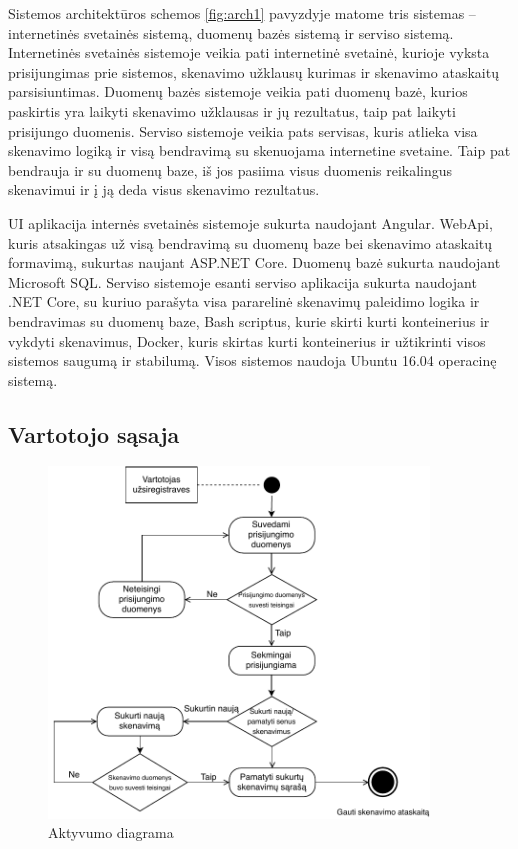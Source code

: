 \documentclass[a4paper,12pt,fleqn]{article}
\begin{document}
Sistemos architektūros schemos \ref{fig:arch1} pavyzdyje matome tris sistemas – internetinės svetainės sistemą, duomenų bazės sistemą ir serviso sistemą. Internetinės svetainės sistemoje veikia pati internetinė svetainė, kurioje vyksta prisijungimas prie sistemos, skenavimo užklausų kurimas ir skenavimo ataskaitų parsisiuntimas. Duomenų bazės sistemoje veikia pati duomenų bazė, kurios paskirtis yra laikyti skenavimo užklausas ir jų rezultatus, taip pat laikyti prisijungo duomenis. Serviso sistemoje veikia pats servisas, kuris atlieka visa skenavimo logiką ir visą bendravimą su skenuojama internetine svetaine. Taip pat bendrauja ir su duomenų baze, iš jos pasiima visus duomenis reikalingus skenavimui ir į ją deda visus skenavimo rezultatus. 

UI aplikacija internės svetainės sistemoje sukurta naudojant Angular. WebApi, kuris atsakingas už visą bendravimą su duomenų baze bei skenavimo ataskaitų formavimą, sukurtas naujant ASP.NET Core. 
Duomenų bazė sukurta naudojant Microsoft SQL. Serviso sistemoje esanti serviso aplikacija sukurta naudojant .NET Core, su kuriuo parašyta visa pararelinė skenavimų paleidimo logika ir bendravimas su duomenų baze, Bash scriptus, kurie skirti kurti konteinerius ir vykdyti skenavimus, Docker, kuris skirtas kurti konteinerius ir užtikrinti visos sistemos saugumą ir stabilumą. Visos sistemos naudoja Ubuntu 16.04 operacinę sistemą. 

\subsection{Vartotojo sąsaja}

\begin{figure}[H]
	\centering
	\includegraphics[width=0.9\textwidth]{figs/Activitylt.pdf}
	\caption{Aktyvumo diagrama}
	\label{fig:activity}
\end{figure}
\end{document}
